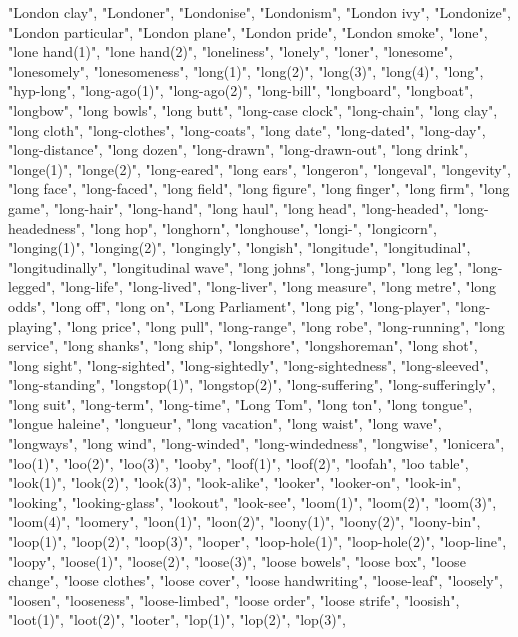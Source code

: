 "London clay",
"Londoner",
"Londonise",
"Londonism",
"London ivy",
"Londonize",
"London particular",
"London plane",
"London pride",
"London smoke",
"lone",
"lone hand(1)",
"lone hand(2)",
"loneliness",
"lonely",
"loner",
"lonesome",
"lonesomely",
"lonesomeness",
"long(1)",
"long(2)",
"long(3)",
"long(4)",
"long",
"hyp-long",
"long-ago(1)",
"long-ago(2)",
"long-bill",
"longboard",
"longboat",
"longbow",
"long bowls",
"long butt",
"long-case clock",
"long-chain",
"long clay",
"long cloth",
"long-clothes",
"long-coats",
"long date",
"long-dated",
"long-day",
"long-distance",
"long dozen",
"long-drawn",
"long-drawn-out",
"long drink",
"longe(1)",
"longe(2)",
"long-eared",
"long ears",
"longeron",
"longeval",
"longevity",
"long face",
"long-faced",
"long field",
"long figure",
"long finger",
"long firm",
"long game",
"long-hair",
"long-hand",
"long haul",
"long head",
"long-headed",
"long-headedness",
"long hop",
"longhorn",
"longhouse",
"longi-",
"longicorn",
"longing(1)",
"longing(2)",
"longingly",
"longish",
"longitude",
"longitudinal",
"longitudinally",
"longitudinal wave",
"long johns",
"long-jump",
"long leg",
"long-legged",
"long-life",
"long-lived",
"long-liver",
"long measure",
"long metre",
"long odds",
"long off",
"long on",
"Long Parliament",
"long pig",
"long-player",
"long-playing",
"long price",
"long pull",
"long-range",
"long robe",
"long-running",
"long service",
"long shanks",
"long ship",
"longshore",
"longshoreman",
"long shot",
"long sight",
"long-sighted",
"long-sightedly",
"long-sightedness",
"long-sleeved",
"long-standing",
"longstop(1)",
"longstop(2)",
"long-suffering",
"long-sufferingly",
"long suit",
"long-term",
"long-time",
"Long Tom",
"long ton",
"long tongue",
"longue haleine",
"longueur",
"long vacation",
"long waist",
"long wave",
"longways",
"long wind",
"long-winded",
"long-windedness",
"longwise",
"lonicera",
"loo(1)",
"loo(2)",
"loo(3)",
"looby",
"loof(1)",
"loof(2)",
"loofah",
"loo table",
"look(1)",
"look(2)",
"look(3)",
"look-alike",
"looker",
"looker-on",
"look-in",
"looking",
"looking-glass",
"lookout",
"look-see",
"loom(1)",
"loom(2)",
"loom(3)",
"loom(4)",
"loomery",
"loon(1)",
"loon(2)",
"loony(1)",
"loony(2)",
"loony-bin",
"loop(1)",
"loop(2)",
"loop(3)",
"looper",
"loop-hole(1)",
"loop-hole(2)",
"loop-line",
"loopy",
"loose(1)",
"loose(2)",
"loose(3)",
"loose bowels",
"loose box",
"loose change",
"loose clothes",
"loose cover",
"loose handwriting",
"loose-leaf",
"loosely",
"loosen",
"looseness",
"loose-limbed",
"loose order",
"loose strife",
"loosish",
"loot(1)",
"loot(2)",
"looter",
"lop(1)",
"lop(2)",
"lop(3)",
